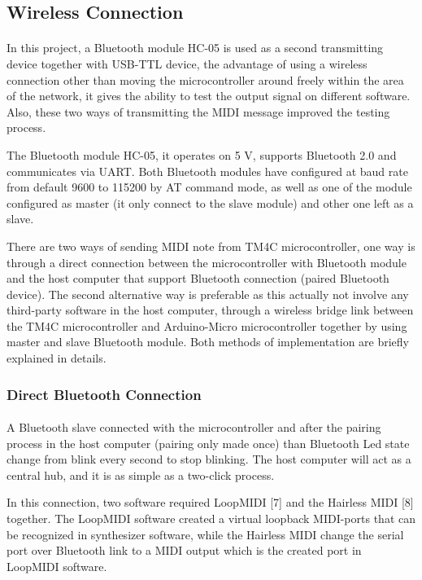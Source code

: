 \documentclass{article}
\begin{document}
\subsection{Wireless Connection}
\paragraph{}In this project, a Bluetooth module HC-05 is used as a second transmitting device together with USB-TTL device, the advantage of using a wireless connection other than moving the microcontroller around freely within the area of the network, it gives the ability to test the output signal on different software. Also, these two ways of transmitting the MIDI message improved the testing process. 

The Bluetooth module HC-05, it operates on 5 V, supports Bluetooth 2.0 and communicates via UART. Both Bluetooth modules have configured at baud rate from default 9600 to 115200 by AT command mode, as well as one of the module configured as master (it only connect to the slave module) and other one left as a slave.

There are two ways of sending MIDI note from TM4C microcontroller, one way is through a direct connection between the microcontroller with Bluetooth module and the host computer that support Bluetooth connection (paired Bluetooth device). The second alternative way is preferable as this actually not involve any third-party software in the host computer, through a wireless bridge link between the TM4C microcontroller and Arduino-Micro microcontroller together by using master and slave Bluetooth module. Both methods of implementation are briefly explained in details.
\subsubsection{Direct Bluetooth Connection}
\paragraph{}A Bluetooth slave connected with the microcontroller and after the pairing process in the host computer (pairing only made once) than Bluetooth Led state change from blink every second to stop blinking. The host computer will act as a central hub, and it is as simple as a two-click process.

In this connection, two software required LoopMIDI [7] and the Hairless MIDI [8] together. The LoopMIDI software created a virtual loopback MIDI-ports that can be recognized in synthesizer software, while the Hairless MIDI change the serial port over Bluetooth link to a MIDI output which is the created port in LoopMIDI software. 
\end{document}
